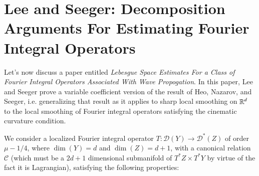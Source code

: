 \chapter{Lee and Seeger: Decomposition Arguments For Estimating Fourier Integral Operators}

Let's now discuss a paper \cite{LeeSeeger} entitled \emph{Lebesgue Space Estimates For a Class of Fourier Integral Operators Associated With Wave Propogation}. In this paper, Lee and Seeger prove a variable coefficient version of the result of Heo, Nazarov, and Seeger, i.e. generalizing that result as it applies to sharp local smoothing on $\operatorname{\mathbb{R}}^d$ to the local smoothing of Fourier integral operators satisfying the cinematic curvature condition.

We consider a localized Fourier integral operator $T: \mathcal{D}(Y) \to \mathcal{D}^*(Z)$ of order $\mu - 1/4$, where $\dim(Y) = d$ and $\dim(Z) = d + 1$, with a canonical relation $\mathcal{C}$ (which must be a $2d + 1$ dimensional submanifold of $T^* Z \times T^* Y$ by virtue of the fact it is Lagrangian), satisfying the following properties:
%
